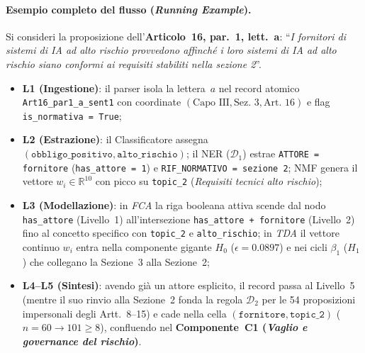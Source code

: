 \documentclass[12pt,a4paper,oneside]{report}
\begin{document}
\paragraph{Esempio completo del flusso (\emph{Running Example}).}
Si consideri la proposizione dell'\textbf{Articolo~16, par.~1, lett.~a}: \enquote{\emph{I fornitori di sistemi di IA ad alto rischio provvedono affinché i loro sistemi di IA ad alto rischio siano conformi ai requisiti stabiliti nella sezione 2}}.
\begin{itemize}
    \item \textbf{L1 (Ingestione)}: il parser isola la lettera~$a$ nel record atomico \texttt{Art16\_par1\_a\_sent1} con coordinate $(\text{Capo~III}, \text{Sez.~3}, \text{Art.~16})$ e flag \texttt{is\_normativa = True};
    \item \textbf{L2 (Estrazione)}: il Classificatore assegna $(\texttt{obbligo\_positivo}, \texttt{alto\_rischio})$; il NER ($\mathcal{D}_1$) estrae \texttt{ATTORE = fornitore} (\texttt{has\_attore = 1}) e \texttt{RIF\_NORMATIVO = sezione 2}; NMF genera il vettore $w_i \in \mathbb{R}^{10}$ con picco su \texttt{topic\_2} (\emph{Requisiti tecnici alto rischio});
    \item \textbf{L3 (Modellazione)}: in \emph{FCA} la riga booleana attiva scende dal nodo \texttt{has\_attore} (Livello~1) all'intersezione \texttt{has\_attore + fornitore} (Livello~2) fino al concetto specifico con \texttt{topic\_2} e \texttt{alto\_rischio}; in \emph{TDA} il vettore continuo $w_i$ entra nella componente gigante $H_0$ ($\epsilon = \num{0,0897}$) e nei cicli $\beta_1$ ($H_1$) che collegano la Sezione~3 alla Sezione~2;
    \item \textbf{L4--L5 (Sintesi)}: avendo già un attore esplicito, il record passa al Livello~5 (mentre il suo rinvio alla Sezione~2 fonda la regola $\mathcal{D}_2$ per le 54 proposizioni impersonali degli Artt.~8--15) e cade nella cella $(\texttt{fornitore}, \texttt{topic\_2})$ ($n = 60 \to 101 \ge 8$), confluendo nel \textbf{Componente~C1 (\emph{Vaglio e governance del rischio})}.
\end{itemize}
\end{document}
